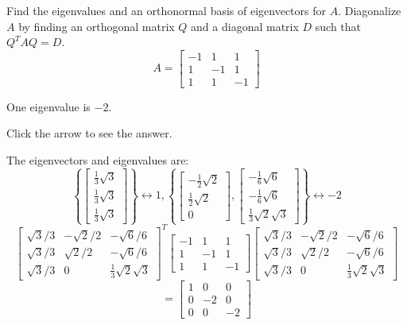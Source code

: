 \documentclass{ximera}
\begin{document}
 \begin{problem}\label{prb:9.3} Find the eigenvalues and an orthonormal basis of eigenvectors for $A.$
Diagonalize $A$ by finding an orthogonal matrix $Q$ and a diagonal matrix $D$
such that $Q^{T}AQ=D$.
\begin{equation*}
A=\left[
\begin{array}{rrr}
-1 & 1 & 1 \\
1 & -1 & 1 \\
1 & 1 & -1
\end{array}
\right]
\end{equation*}

\begin{hint} 
One eigenvalue is $-2$.

Click the arrow to see the answer. \begin{expandable}
The eigenvectors and eigenvalues are:
\[
\left\{ \left[
\begin{array}{c}
\frac{1}{3}\sqrt{3} \\
\frac{1}{3}\sqrt{3} \\
\frac{1}{3}\sqrt{3}
\end{array}
\right] \right\} \leftrightarrow 1,\left\{ \left[
\begin{array}{c}
-\frac{1}{2}\sqrt{2} \\
\frac{1}{2}\sqrt{2} \\
0
\end{array}
\right] ,  \left[
\begin{array}{c}
-\frac{1}{6}\sqrt{6} \\
-\frac{1}{6}\sqrt{6} \\
\frac{1}{3}\sqrt{2}\sqrt{3}
\end{array}
\right] \right\} \leftrightarrow -2
\]
$$
\left[
\begin{array}{ccc}
\sqrt{3}/3 & -\sqrt{2}/2 & -\sqrt{6}/6 \\
\sqrt{3}/3 & \sqrt{2}/2 & -\sqrt{6}/6 \\
\sqrt{3}/3 & 0 & \frac{1}{3}\sqrt{2}\sqrt{3}
\end{array}
\right]^{T}\left[
\begin{array}{rrr}
-1 & 1 & 1 \\
1 & -1 & 1 \\
1 & 1 & -1
\end{array}
\right] \left[
\begin{array}{ccc}
\sqrt{3}/3 & -\sqrt{2}/2 & -\sqrt{6}/6 \\
\sqrt{3}/3 & \sqrt{2}/2 & -\sqrt{6}/6 \\
\sqrt{3}/3 & 0 & \frac{1}{3}\sqrt{2}\sqrt{3}
\end{array}
\right]
$$
\[
=\left[
\begin{array}{rrr}
1 & 0 & 0 \\
0 & -2 & 0 \\
0 & 0 & -2
\end{array}
\right]
\]
\end{expandable} \end{hint}
\end{problem}
\end{document}
